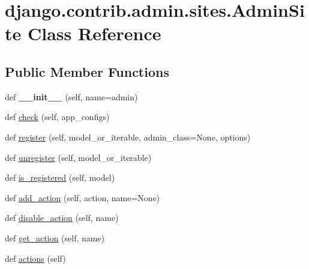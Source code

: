 \hypertarget{classdjango_1_1contrib_1_1admin_1_1sites_1_1_admin_site}{}\section{django.\+contrib.\+admin.\+sites.\+Admin\+Site Class Reference}
\label{classdjango_1_1contrib_1_1admin_1_1sites_1_1_admin_site}
\subsection*{Public Member Functions}
\begin{DoxyCompactItemize}
\item 
\mbox{\label{classdjango_1_1contrib_1_1admin_1_1sites_1_1_admin_site_a194babd4022e7222f3ebbeb7341cd6df}} 
def {\bfseries \+\_\+\+\_\+init\+\_\+\+\_\+} (self, name=\textquotesingle{}admin\textquotesingle{})
\item 
def \mbox{\hyperlink{classdjango_1_1contrib_1_1admin_1_1sites_1_1_admin_site_af03dc13f2db71bb48df03e7fd721dfe6}{check}} (self, app\+\_\+configs)
\item 
def \mbox{\hyperlink{classdjango_1_1contrib_1_1admin_1_1sites_1_1_admin_site_a896772017072aacb3d9d133467addf21}{register}} (self, model\+\_\+or\+\_\+iterable, admin\+\_\+class=None, options)
\item 
def \mbox{\hyperlink{classdjango_1_1contrib_1_1admin_1_1sites_1_1_admin_site_a865a7f774b0042ee7579112d0e9c51f7}{unregister}} (self, model\+\_\+or\+\_\+iterable)
\item 
def \mbox{\hyperlink{classdjango_1_1contrib_1_1admin_1_1sites_1_1_admin_site_ac1a792f79437cded58c47657080621c5}{is\+\_\+registered}} (self, model)
\item 
def \mbox{\hyperlink{classdjango_1_1contrib_1_1admin_1_1sites_1_1_admin_site_a77e06b58f64ce4f3f283599d39aadcca}{add\+\_\+action}} (self, action, name=None)
\item 
def \mbox{\hyperlink{classdjango_1_1contrib_1_1admin_1_1sites_1_1_admin_site_a4d7a09e82e7ec64e422883450e5a8584}{disable\+\_\+action}} (self, name)
\item 
def \mbox{\hyperlink{classdjango_1_1contrib_1_1admin_1_1sites_1_1_admin_site_a16153802d8c5aafc65ad2befb14c8f1e}{get\+\_\+action}} (self, name)
\item 
def \mbox{\hyperlink{classdjango_1_1contrib_1_1admin_1_1sites_1_1_admin_site_a13215f2700042f55f27bb7afe56bdc08}{actions}} (self)

\end{DoxyCompactItemize}

